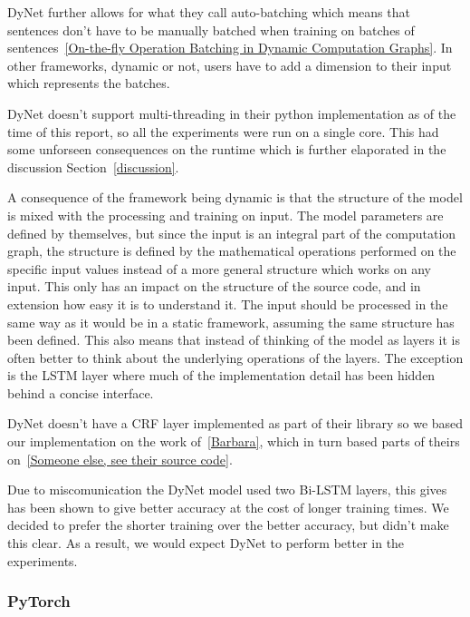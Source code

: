DyNet further allows for what they call auto-batching which means that sentences
don't have to be manually batched when training on batches of
sentences~\ref{On-the-fly Operation Batching in Dynamic Computation Graphs}. In
other frameworks, dynamic or not, users have to add a dimension to their input
which represents the batches.

DyNet doesn't support multi-threading in their python implementation as of the
time of this report, so all the experiments were run on a single core. This had
some unforseen consequences on the runtime which is further elaporated in the
discussion Section~\ref{discussion}.

A consequence of the framework being dynamic is that the structure of the model
is mixed with the processing and training on input. The model parameters are
defined by themselves, but since the input is an integral part of the
computation graph, the structure is defined by the mathematical operations
performed on the specific input values instead of a more general structure which
works on any input. This only has an impact on the structure of the source code,
and in extension how easy it is to understand it. The input should be processed
in the same way as it would be in a static framework, assuming the same
structure has been defined. This also means that instead of thinking of the
model as layers it is often better to think about the underlying operations of
the layers. The exception is the LSTM layer where much of the
implementation detail has been hidden behind a concise interface.

DyNet doesn't have a CRF layer implemented as part of their library so we based
our implementation on the work of~\ref{Barbara}, which in turn based parts of
theirs on~\ref{Someone else, see their source code}. 

Due to miscomunication the DyNet model used two Bi-LSTM layers, this gives has
been shown to give better accuracy at the cost of longer training times. We
decided to prefer the shorter training over the better accuracy, but didn't make
this clear. As a result, we would expect DyNet to perform better in the
experiments.



\subsubsection*{PyTorch}

